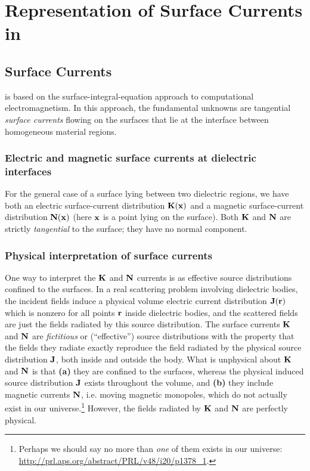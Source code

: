 \newpage
\section{Representation of Surface Currents in \ls}

\subsection*{Surface Currents}

\lss is based on the surface-integral-equation approach
to computational electromagnetism. In this approach, the
fundamental unknowns are tangential \textit{surface
currents} flowing on the surfaces that lie at the 
interface between homogeneous material regions.

\subsubsection*{Electric and magnetic surface currents at dielectric 
                interfaces}
For the general case of a surface lying between two
dielectric regions, we have both an electric 
surface-current distribution $\mathbf{K}(\mathbf{x})$ and a 
magnetic surface-current distribution $\mathbf{N}(\mathbf{x})$
(here $\mathbf{x}$ is a point lying on the surface).
Both $\mathbf{K}$ and $\mathbf{N}$ are strictly \textit{tangential}
to the surface; they have no normal component.

\subsubsection*{Physical interpretation of surface currents}

One way to interpret the $\mathbf{K}$ and $\mathbf{N}$ currents
is as effective source distributions confined to the surfaces. 
In a real scattering problem involving dielectric bodies, the 
incident fields induce a physical volume electric current 
distribution $\mathbf{J}(\mathbf{r})$ which is nonzero for all points 
$\mathbf{r}$ inside dielectric bodies, and the scattered fields 
are just the fields radiated by this source distribution.
The surface currents $\mathbf{K}$ and $\mathbf{N}$ are \textit{fictitious}
or (``effective'') source distributions with the property 
that the fields they radiate exactly reproduce the 
field radiated by the physical source distribution $\mathbf{J}$,
both inside and outside the body. What is unphysical about 
$\mathbf{K}$ and $\mathbf{N}$ is that \textbf{(a)} they are confined to 
the surfaces, whereas the physical induced source distribution
$\mathbf{J}$ exists throughout the volume, and \textbf{(b)} they
include magnetic currents $\mathbf{N}$, i.e. moving magnetic monopoles,
which do not actually exist in our universe.\footnote{Perhaps
we should say no more than \textit{one} of them exists in our 
universe: \url{http://prl.aps.org/abstract/PRL/v48/i20/p1378_1}.}
However, the fields radiated by $\mathbf{K}$ and $\mathbf{N}$ are 
perfectly physical.

